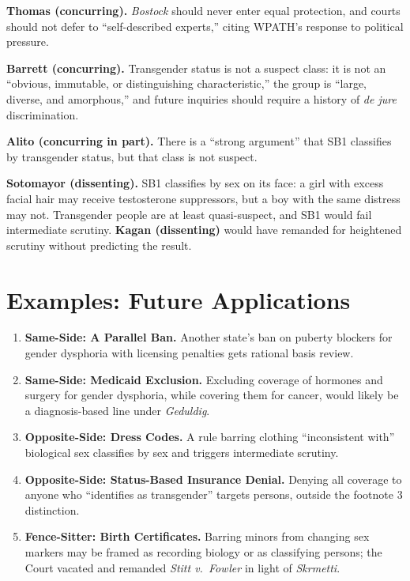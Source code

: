 \documentclass[12pt]{article}
\begin{document}
\textbf{Thomas (concurring).} \textit{Bostock} should never enter equal protection, and courts should not defer to ``self-described experts,'' citing WPATH's response to political pressure.

\textbf{Barrett (concurring).} Transgender status is not a suspect class: it is not an ``obvious, immutable, or distinguishing characteristic,'' the group is ``large, diverse, and amorphous,'' and future inquiries should require a history of \textit{de jure} discrimination.

\textbf{Alito (concurring in part).} There is a ``strong argument'' that SB1 classifies by transgender status, but that class is not suspect.

\textbf{Sotomayor (dissenting).} SB1 classifies by sex on its face: a girl with excess facial hair may receive testosterone suppressors, but a boy with the same distress may not. Transgender people are at least quasi-suspect, and SB1 would fail intermediate scrutiny. \textbf{Kagan (dissenting)} would have remanded for heightened scrutiny without predicting the result.

\section{Examples: Future Applications}

\begin{enumerate}
\item \textbf{Same-Side: A Parallel Ban.} Another state's ban on puberty blockers for gender dysphoria with licensing penalties gets rational basis review.
\item \textbf{Same-Side: Medicaid Exclusion.} Excluding coverage of hormones and surgery for gender dysphoria, while covering them for cancer, would likely be a diagnosis-based line under \textit{Geduldig}.
\item \textbf{Opposite-Side: Dress Codes.} A rule barring clothing ``inconsistent with'' biological sex classifies by sex and triggers intermediate scrutiny.
\item \textbf{Opposite-Side: Status-Based Insurance Denial.} Denying all coverage to anyone who ``identifies as transgender'' targets persons, outside the footnote 3 distinction.
\item \textbf{Fence-Sitter: Birth Certificates.} Barring minors from changing sex markers may be framed as recording biology or as classifying persons; the Court vacated and remanded \textit{Stitt v.\ Fowler} in light of \textit{Skrmetti}.
\end{enumerate}
\end{document}
